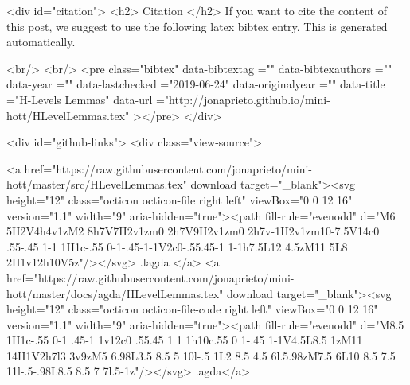   
  <div id="citation">
  <h2> Citation </h2>
  If you want to cite the content of this post,
  we suggest to use the following latex bibtex entry.
  This is generated automatically.

  <br/>
  <br/>
  <pre class="bibtex"
       data-bibtextag =""
       data-bibtexauthors =""
       data-year =""
       data-lastchecked ="2019-06-24"
       data-originalyear =""
       data-title ="H-Levels Lemmas"
       data-url ="http://jonaprieto.github.io/mini-hott/HLevelLemmas.tex"
  ></pre>
  </div>
  

  <div id="github-links">
    <div class="view-source">
      
        <a href="https://raw.githubusercontent.com/jonaprieto/mini-hott/master/src/HLevelLemmas.tex" download target="_blank"><svg height="12" class="octicon octicon-file right left" viewBox="0 0 12 16" version="1.1" width="9" aria-hidden="true"><path fill-rule="evenodd" d="M6 5H2V4h4v1zM2 8h7V7H2v1zm0 2h7V9H2v1zm0 2h7v-1H2v1zm10-7.5V14c0 .55-.45 1-1 1H1c-.55 0-1-.45-1-1V2c0-.55.45-1 1-1h7.5L12 4.5zM11 5L8 2H1v12h10V5z"/></svg> .lagda </a>
        <a href="https://raw.githubusercontent.com/jonaprieto/mini-hott/master/docs/agda/HLevelLemmas.tex" download target="_blank"><svg height="12" class="octicon octicon-file-code right left" viewBox="0 0 12 16" version="1.1" width="9" aria-hidden="true"><path fill-rule="evenodd" d="M8.5 1H1c-.55 0-1 .45-1 1v12c0 .55.45 1 1 1h10c.55 0 1-.45 1-1V4.5L8.5 1zM11 14H1V2h7l3 3v9zM5 6.98L3.5 8.5 5 10l-.5 1L2 8.5 4.5 6l.5.98zM7.5 6L10 8.5 7.5 11l-.5-.98L8.5 8.5 7 7l.5-1z"/></svg> .agda</a>
      
